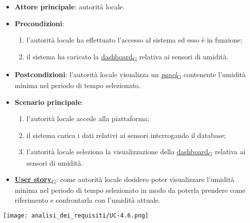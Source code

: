 \begin{itemize}
	\item \textbf{Attore principale}: autorità locale.
	\item \textbf{Precondizioni}:
	      \begin{enumerate}
		      \item l'autorità locale ha effettuato l'accesso al sistema ed esso è in funzione;
		      \item il sistema ha caricato la \href{https://7last.github.io/docs/rtb/documentazione-interna/glossario\#dashboard}{dashboard\textsubscript{G}} relativa ai sensori di umidità.
	      \end{enumerate}
	\item \textbf{Postcondizioni}: l'autorità locale visualizza un \href{https://7last.github.io/docs/rtb/documentazione-interna/glossario\#panel}{\textit{panel}\textsubscript{G}} contenente l'umidità minima nel periodo di tempo selezionato.
	\item \textbf{Scenario principale}:
	      \begin{enumerate}
		      \item l'autorità locale accede alla piattaforma;
		      \item il sistema carica i dati relativi ai sensori interrogando il database;
		      \item l'autorità locale seleziona la visualizzazione della \href{https://7last.github.io/docs/rtb/documentazione-interna/glossario\#dashboard}{dashboard\textsubscript{G}} relativa ai sensori di umidità.
	      \end{enumerate}
	\item \href{https://7last.github.io/docs/rtb/documentazione-interna/glossario\#user-story}{\textbf{User story}\textsubscript{G}}:
	      come autorità locale desidero poter visualizzare l'umidità minima nel periodo di tempo selezionato
	      in modo da poterla prendere come riferimento e confrontarla con l'umidità attuale.
\end{itemize}
\begin{center}
	\texttt{[image: analisi\_dei\_requisiti/UC-4.6.png]}
\end{center}

